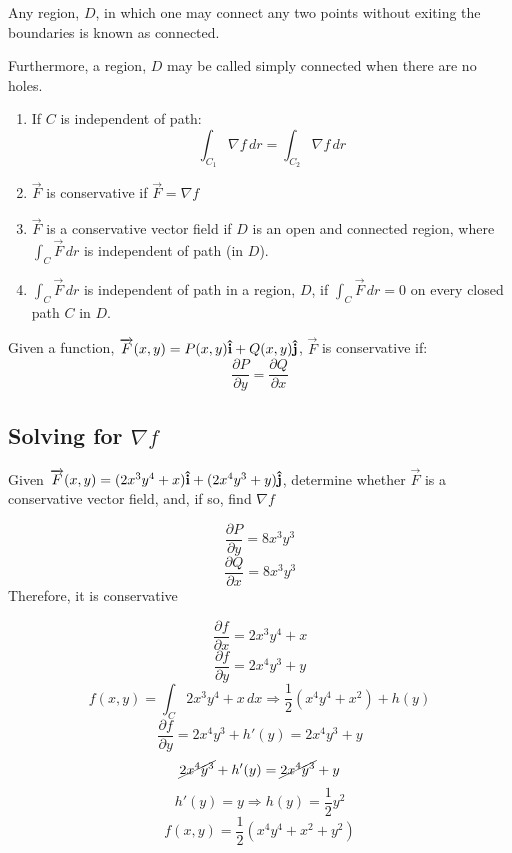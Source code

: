 \documentclass[12pt]{article}
\begin{document}
Any region, $D$, in which one may connect any two points without exiting the boundaries is known as connected.

Furthermore, a region, $D$ may be called simply connected when there are no holes.

\begin{enumerate}

  \item If $C$ is independent of path:
    $$\int_{C_1}\nabla f\,dr=\int_{C_2}\nabla f\,dr$$

  \item $\overrightarrow{F}$ is conservative if $\overrightarrow{F}=\nabla f$

  \item $\overrightarrow{F}$ is a conservative vector field if $D$ is an open and connected region, where $\int_C \overrightarrow{F}\,dr$ is independent of path (in $D$).

  \item $\int_C \overrightarrow{F}\,dr$ is independent of path in a region, $D$, if $\int_C \overrightarrow{F}\,dr=0$ on every closed path $C$ in $D$.

\end{enumerate}  

    Given a function, $\overrightarrow{F}(x,y)=P(x,y)\bold{\hat{i}}+Q(x,y)\bold{\hat{j}}$,  $\overrightarrow{F}$ is conservative if:
    $$\frac{\partial P}{\partial y}=\frac{\partial Q}{\partial x}$$

    \subsection{Solving for $\nabla f$}

    Given $\overrightarrow{F}(x,y)=(2x^3y^4+x)\bold{\hat{i}}+(2x^4y^3+y)\bold{\hat{j}}$, determine whether $\overrightarrow{F}$ is a conservative vector field, and, if so, find $\nabla f$

    $$\frac{\partial P}{\partial y}=8x^3y^3$$
    $$\frac{\partial Q}{\partial x}=8x^3y^3$$
    Therefore, it is conservative

    $$\frac{\partial f}{\partial x}=2x^3y^4+x$$
    $$\frac{\partial f}{\partial y}=2x^4y^3+y$$
    $$f(x,y)=\int_C 2x^3y^4+x\,dx\Rightarrow\frac{1}{2}(x^4y^4+x^2)+h(y)$$
    $$\frac{\partial f}{\partial y}=2x^4y^3+h'(y)=2x^4y^3+y$$
    $$\cancel{2x^4y^3}+h'(y)=\cancel{2x^4y^3}+y$$
    $$h'(y)=y\Rightarrow h(y)=\frac{1}{2}y^2$$
    $$f(x,y)=\frac{1}{2}(x^4y^4+x^2+y^2)$$
\end{document}
